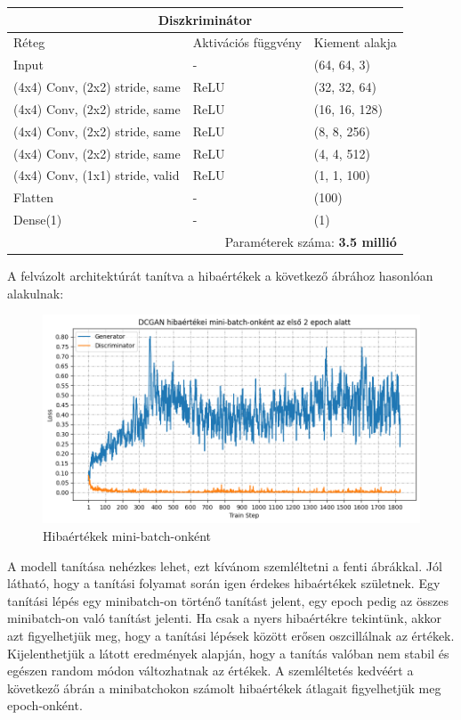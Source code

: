\begin{tabular}{ |p{6cm}||p{4cm}|p{3cm}|  }
	\hline
	\multicolumn{3}{|c|}{\textbf{Diszkriminátor}} \\
	\hline
	Réteg & Aktivációs függvény & Kiement alakja\\
	\hline
	Input & - & (64, 64, 3)\\
	(4x4) Conv, (2x2) stride, same & ReLU & (32, 32, 64)\\
	(4x4) Conv, (2x2) stride, same & ReLU & (16, 16, 128)\\
	(4x4) Conv, (2x2) stride, same & ReLU & (8, 8, 256)\\
	(4x4) Conv, (2x2) stride, same & ReLU & (4, 4, 512)\\
	(4x4) Conv, (1x1) stride, valid & ReLU & (1, 1, 100)\\
	Flatten & - & (100)\\
	Dense(1) & - & (1)\\
	\hline
	\multicolumn{3}{|r|}{Paraméterek száma: \textbf{3.5 millió}} \\
	\hline
\end{tabular}

A felvázolt architektúrát tanítva a hibaértékek a következő ábrához hasonlóan alakulnak:

\begin{figure}[h]
\centering
\includegraphics[width=15cm]{images/miniloss.png}
\caption{Hibaértékek mini-batch-onként}
\label{fig:mini-batch_loss_plot}
\end{figure}

A modell tanítása nehézkes lehet, ezt kívánom szemléltetni a fenti ábrákkal.
Jól látható, hogy a tanítási folyamat során igen érdekes hibaértékek születnek. Egy tanítási lépés egy minibatch-on történő tanítást jelent, egy epoch pedig az összes minibatch-on való tanítást jelenti.
Ha csak a nyers hibaértékre tekintünk, akkor azt figyelhetjük meg, hogy a tanítási lépések között erősen oszcillálnak az értékek. Kijelenthetjük a látott eredmények alapján, hogy a tanítás valóban nem stabil és egészen random módon változhatnak az értékek.
A szemléltetés kedvéért a következő ábrán a minibatchokon számolt hibaértékek átlagait figyelhetjük meg epoch-onként.

